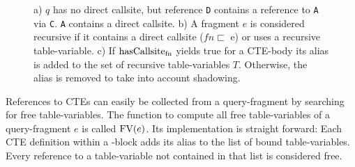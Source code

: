 \begin{figure}[h]
    \small
    \centering
    \caption{a) $q$ has no direct callsite, but reference \texttt{D} contains a reference to \texttt{A} via \texttt{C}. \texttt{A} contains a direct callsite. b) A fragment $e$ is considered recursive if it contains a direct callsite ($fn \sqsubset$ e) or uses a recursive table-variable. c) If $\operatorname{\text{hasCallsite}_{fn}}$ yields true for a CTE-body its alias is added to the set of recursive table-variables $T$. Otherwise, the alias is removed to take into account shadowing.}
    \label{fig:tracking_recursive_ctes}
\end{figure}

References to CTEs can easily be collected from a query-fragment by searching for free table-variables. The function to compute all free table-variables of a query-fragment $e$ is called $\operatorname{\text{\rm FV}}(e)$. Its implementation is straight forward: Each CTE definition within a \WITH-block adds its alias to the list of bound table-variables. Every reference to a table-variable not contained in that list is considered free.

